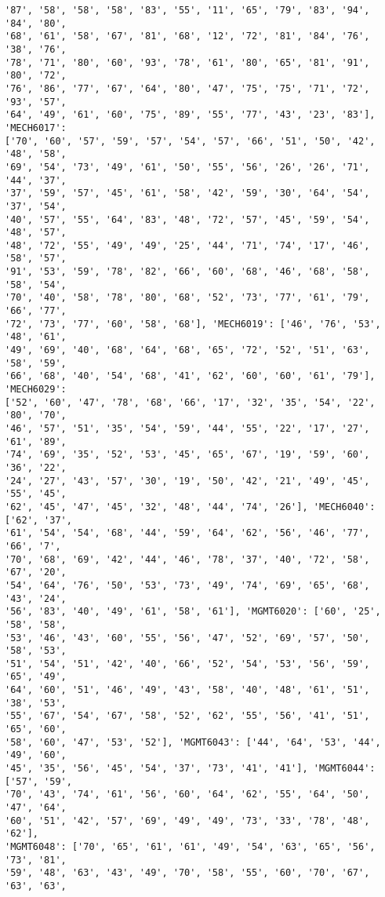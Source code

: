\documentclass[11pt]{article}
\begin{document}
\begin{Verbatim}[commandchars=\\\{\}]
'87', '58', '58', '58', '83', '55', '11', '65', '79', '83', '94', '84', '80',
'68', '61', '58', '67', '81', '68', '12', '72', '81', '84', '76', '38', '76',
'78', '71', '80', '60', '93', '78', '61', '80', '65', '81', '91', '80', '72',
'76', '86', '77', '67', '64', '80', '47', '75', '75', '71', '72', '93', '57',
'64', '49', '61', '60', '75', '89', '55', '77', '43', '23', '83'], 'MECH6017':
['70', '60', '57', '59', '57', '54', '57', '66', '51', '50', '42', '48', '58',
'69', '54', '73', '49', '61', '50', '55', '56', '26', '26', '71', '44', '37',
'37', '59', '57', '45', '61', '58', '42', '59', '30', '64', '54', '37', '54',
'40', '57', '55', '64', '83', '48', '72', '57', '45', '59', '54', '48', '57',
'48', '72', '55', '49', '49', '25', '44', '71', '74', '17', '46', '58', '57',
'91', '53', '59', '78', '82', '66', '60', '68', '46', '68', '58', '58', '54',
'70', '40', '58', '78', '80', '68', '52', '73', '77', '61', '79', '66', '77',
'72', '73', '77', '60', '58', '68'], 'MECH6019': ['46', '76', '53', '48', '61',
'49', '69', '40', '68', '64', '68', '65', '72', '52', '51', '63', '58', '59',
'66', '68', '40', '54', '68', '41', '62', '60', '60', '61', '79'], 'MECH6029':
['52', '60', '47', '78', '68', '66', '17', '32', '35', '54', '22', '80', '70',
'46', '57', '51', '35', '54', '59', '44', '55', '22', '17', '27', '61', '89',
'74', '69', '35', '52', '53', '45', '65', '67', '19', '59', '60', '36', '22',
'24', '27', '43', '57', '30', '19', '50', '42', '21', '49', '45', '55', '45',
'62', '45', '47', '45', '32', '48', '44', '74', '26'], 'MECH6040': ['62', '37',
'61', '54', '54', '68', '44', '59', '64', '62', '56', '46', '77', '66', '7',
'70', '68', '69', '42', '44', '46', '78', '37', '40', '72', '58', '67', '20',
'54', '64', '76', '50', '53', '73', '49', '74', '69', '65', '68', '43', '24',
'56', '83', '40', '49', '61', '58', '61'], 'MGMT6020': ['60', '25', '58', '58',
'53', '46', '43', '60', '55', '56', '47', '52', '69', '57', '50', '58', '53',
'51', '54', '51', '42', '40', '66', '52', '54', '53', '56', '59', '65', '49',
'64', '60', '51', '46', '49', '43', '58', '40', '48', '61', '51', '38', '53',
'55', '67', '54', '67', '58', '52', '62', '55', '56', '41', '51', '65', '60',
'58', '60', '47', '53', '52'], 'MGMT6043': ['44', '64', '53', '44', '49', '60',
'45', '35', '56', '45', '54', '37', '73', '41', '41'], 'MGMT6044': ['57', '59',
'70', '43', '74', '61', '56', '60', '64', '62', '55', '64', '50', '47', '64',
'60', '51', '42', '57', '69', '49', '49', '73', '33', '78', '48', '62'],
'MGMT6048': ['70', '65', '61', '61', '49', '54', '63', '65', '56', '73', '81',
'59', '48', '63', '43', '49', '70', '58', '55', '60', '70', '67', '63', '63',

\end{Verbatim}
\end{document}
